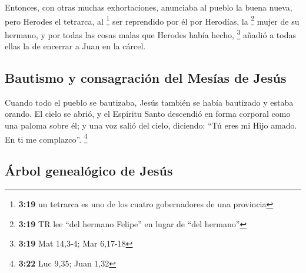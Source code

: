 \begin{paracol}{2}
 Entonces, con otras muchas exhortaciones, anunciaba al
pueblo la buena nueva,  pero Herodes el tetrarca, al
\footnote{\textbf{3:19} un tetrarca es uno de los cuatro gobernadores de
  una provincia} ser reprendido por él por Herodías, la \footnote{\textbf{3:19}
  TR lee ``del hermano Felipe'' en lugar de ``del hermano''} mujer de su
hermano, y por todas las cosas malas que Herodes había hecho,
\footnote{\textbf{3:19} Mat 14,3-4; Mar 6,17-18}  añadió
a todas ellas la de encerrar a Juan en la cárcel.

\hypertarget{bautismo-y-consagraciuxf3n-del-mesuxedas-de-jesuxfas}{%
\subsection{Bautismo y consagración del Mesías de
Jesús}\label{bautismo-y-consagraciuxf3n-del-mesuxedas-de-jesuxfas}}

 Cuando todo el pueblo se bautizaba, Jesús también se
había bautizado y estaba orando. El cielo se abrió,  y el
Espíritu Santo descendió en forma corporal como una paloma sobre él; y
una voz salió del cielo, diciendo: ``Tú eres mi Hijo amado. En ti me
complazco''. \footnote{\textbf{3:22} Luc 9,35; Juan 1,32}

\hypertarget{uxe1rbol-genealuxf3gico-de-jesuxfas}{%
\subsection{Árbol genealógico de
Jesús}\label{uxe1rbol-genealuxf3gico-de-jesuxfas}}


\end{paracol}
